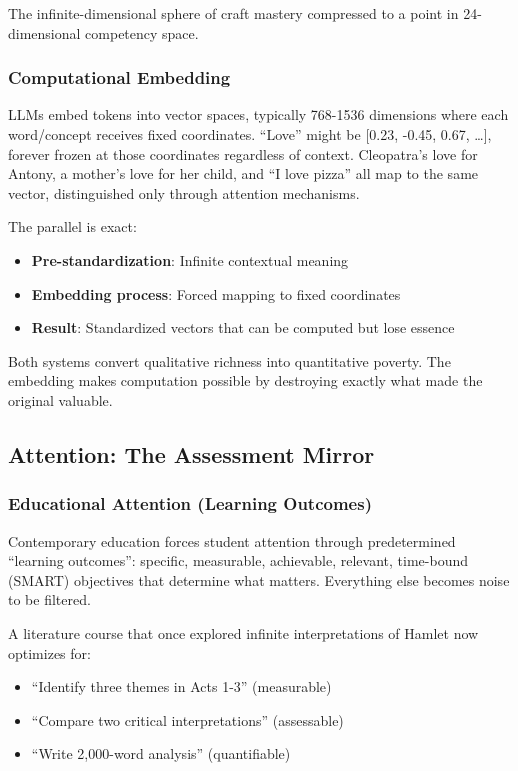 The infinite-dimensional sphere of craft mastery compressed to a point in 24-dimensional competency space.

\subsubsection{Computational Embedding}

LLMs embed tokens into vector spaces, typically 768-1536 dimensions where each word/concept receives fixed coordinates. ``Love'' might be [0.23, -0.45, 0.67, \ldots], forever frozen at those coordinates regardless of context. Cleopatra's love for Antony, a mother's love for her child, and ``I love pizza'' all map to the same vector, distinguished only through attention mechanisms.

The parallel is exact:
\begin{itemize}
\item \textbf{Pre-standardization}: Infinite contextual meaning
\item \textbf{Embedding process}: Forced mapping to fixed coordinates
\item \textbf{Result}: Standardized vectors that can be computed but lose essence
\end{itemize}

Both systems convert qualitative richness into quantitative poverty. The embedding makes computation possible by destroying exactly what made the original valuable.

\subsection{Attention: The Assessment Mirror}

\subsubsection{Educational Attention (Learning Outcomes)}

Contemporary education forces student attention through predetermined ``learning outcomes'': specific, measurable, achievable, relevant, time-bound (SMART) objectives that determine what matters. Everything else becomes noise to be filtered.

A literature course that once explored infinite interpretations of Hamlet now optimizes for:
\begin{itemize}
\item ``Identify three themes in Acts 1-3'' (measurable)
\item ``Compare two critical interpretations'' (assessable)
\item ``Write 2,000-word analysis'' (quantifiable)
\end{itemize}

